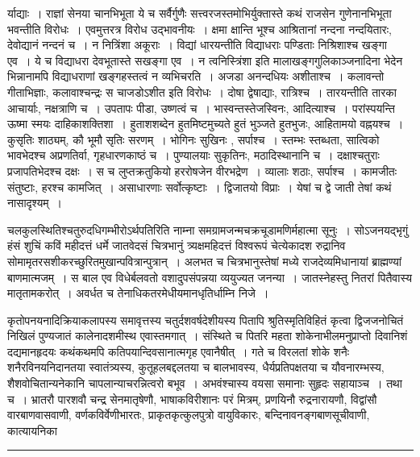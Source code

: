 \documentclass[11pt, openany]{book}
\begin{document}
\noindent
{\s र्याद्याः~। राज्ञां सेनया चानभिभूता ये च सर्वैर्गुणैः सत्त्वरजस्तमोभिर्युक्तास्ते कथं राजसेन गुणेनानभिभूता भवन्तीति विरोधः~। एवमुत्तरत्र विरोध उद्भावनीयः~। क्षमा क्षान्ति भूश्च आश्रितानां नन्दना नन्दयितारः, देवोद्यानं नन्दनं च~। न नित्रिंशा अकूराः~। विद्यां धारयन्तीति विद्याधराः पण्डिताः निश्रिशाश्च खङ्गा एव~। ये च विद्याधरा देवभूतास्ते सखङ्गा एव~। न त्वनिस्त्रिंशा इति मालाखङ्गगुलिकाञ्जनादिना भेदेन भिन्नानामपि विद्याधराणां खङ्गहस्तत्वं न व्यभिचरति~। अजडा अनन्दधियः अशीताश्च~। कलावन्तो गीताभिज्ञाः, कलावाश्चन्द्रः स चाजडोऽशीत इति विरोधः~। दोषा द्वेषाद्याः, रात्रिश्च~। तारयन्तीति तारका आचार्याः, नक्षत्राणि च~। उपतापः पीडा, उष्णत्वं च~। भास्वन्तस्तेजस्विनः, आदित्याश्च~। परांस्पयन्ति ऊष्मा स्मयः दाहिकाशक्तिशा~। हुताशशब्देन हुतमिष्टमुच्यते हुतं भुञ्जते हुतभुजः, आहितामयो वह्नयश्च~। कुसृतिः शाठ्यम्, कौ भूमौ सृतिः सरणम्~। भोगिनः सुखिनः , सर्पाश्च~। स्तम्भः स्तब्धता, सात्विको भावभेदश्च अप्रणतिर्वा, गृहधारणकाष्ठं च~। पुण्यालयाः सुकृतिनः, मठादिस्थानानि च~। दक्षाश्चतुराः प्रजापतिभेदश्च दक्षः~। स च लुप्तक्रतुकियो हररोषजेन वीरभद्रेण~। व्यालाः शठाः, सर्पाश्च~। कामजीतः संतुष्टाः, हरश्च कामजित्~। असाधारणाः सर्वोत्कृष्टाः~। द्विजातयो विप्राः~। येषां च द्वे जाती तेषां कथं नासादृश्यम्~।}

\newpage

\noindent
चलकुलस्थितिश्चतुरुदधिगम्भीरोऽर्थपतिरिति नाम्ना समग्रामजन्मचक्रचूडामणिर्महात्मा सूनुः~। सोऽजनयद्भृगुं हंसं शुचिं कविं महीदत्तं धर्मे जातवेदसं चित्रभानुं त्र्यक्षमहिदत्तं विश्वरूपं चेत्येकादश रुद्रानिव सोमामृतरसशीकरच्छुरितमुखान्पवित्रान्पुत्रान्~। अलभत च चित्रभानुस्तेषां मध्ये राजदेव्यमिधानायां ब्राह्मण्यां बाणमात्मजम्~। स बाल एव विधेर्बलवतो वशादुपसंपन्नया व्ययुज्यत जनन्या~। जातस्नेहस्तु नितरां पितैवास्य मातृतामकरोत्~। अवर्धत च तेनाधिकतरमेधीयमानधृतिर्धाम्नि निजे~।

कृतोपनयनादिक्रियाकलापस्य समावृत्तस्य चतुर्दशवर्षदेशीयस्य पितापि श्रुतिस्मृतिविहितं कृत्वा द्विजजनोचितं निखिलं पुण्यजातं कालेनादशमीस्थ एवास्तमगात्~। संस्थिते च पितरि महता शोकेनाभीलमनुप्राप्तो दिवानिशं दद्यमानहृदयः कथंकथमपि कतिपयान्दिवसानात्मगृह एवानैषीत्~। गते च विरलतां शोके शनैः शनैरविनयनिदानतया स्वातंत्र्यस्य, कुतूहलबद्दलतया च बालभावस्य, धैर्यप्रतिपक्षतया च यौवनारम्भस्य, शैशवोचितान्यनेकानि चापलान्याचरन्नित्वरो बभूव~। अभवंश्चास्य वयसा समानाः सुहृदः सहायाञ्च~। तथा च~। भ्रातरौ पारशवौ चन्द्र सेनमातृषेणौ, भाषाकविरीशानः परं मित्रम्, प्रणयिनौ रुद्रनारायणौ, विद्वांसौ वारबाणवासवाणी, वर्णकविर्वेणीभारतः, प्राकृतकृत्कुलपुत्रो वायुविकारः, बन्दिनावनङ्गबाणसूचीवाणी, कात्यायनिका

\vspace{2mm}
\hrule
\end{document}
